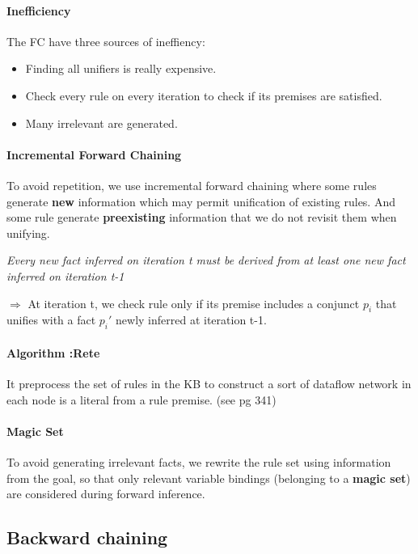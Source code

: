 \paragraph{Inefficiency}

The FC have three sources of ineffiency:
	\begin{itemize}
		\item Finding all unifiers is really expensive.
		\item Check every rule on every iteration to check if its premises are satisfied.
		\item Many irrelevant are generated.
	\end{itemize} 

\paragraph{Incremental Forward Chaining}
To  avoid repetition,  we use  incremental forward  chaining where  some
rules generate \textbf{new} information which may permit unification of existing
rules. And some rule generate \textbf{preexisting} information that we do not revisit
them when unifying.


\textit{Every new fact inferred on iteration t must be derived from at least one
new fact inferred on iteration t-1}

$\Rightarrow$ At iteration t, we check rule only if its premise includes a conjunct 
$p_i$ that unifies with a fact $p_i'$ newly inferred at iteration t-1.

\paragraph{Algorithm :Rete} It preprocess the set  of rules in the KB to
construct a sort  of dataflow network in  each node is a  literal from a
rule premise. (see pg 341)

\paragraph{Magic Set}  To avoid generating irrelevant  facts, we rewrite
the rule  set using  information from  the goal,  so that  only relevant
variable  bindings (belonging  to  a \textbf{magic  set})  are considered  during
forward inference.


\subsection{Backward chaining}

